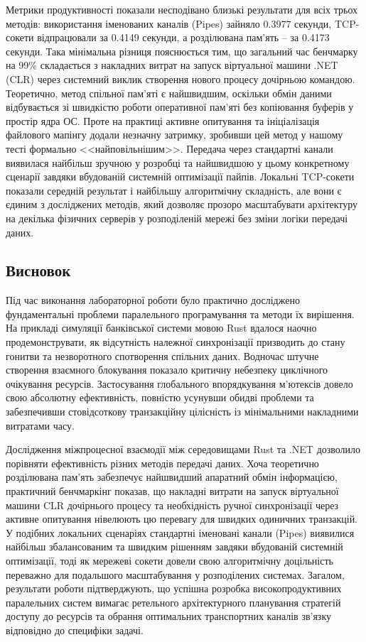 \documentclass[14pt, a4paper]{extreport}
\begin{document}
	Метрики продуктивності показали несподівано близькі результати для всіх трьох методів: використання іменованих каналів (Pipes) зайняло 0.3977 секунди, TCP-сокети відпрацювали за 0.4149 секунди, а розділювана пам'ять -- за 0.4173 секунди. Така мінімальна різниця пояснюється тим, що загальний час бенчмарку на 99\% складається з накладних витрат на запуск віртуальної машини .NET (CLR) через системний виклик створення нового процесу дочірньою командою. Теоретично, метод спільної пам'яті є найшвидшим, оскільки обмін даними відбувається зі швидкістю роботи оперативної пам'яті без копіювання буферів у простір ядра ОС. Проте на практиці активне опитування та ініціалізація файлового мапінгу додали незначну затримку, зробивши цей метод у нашому тесті формально <<найповільнішим>>. Передача через стандартні канали виявилася найбільш зручною у розробці та найшвидшою у цьому конкретному сценарії завдяки вбудованій системній оптимізації пайпів. Локальні TCP-сокети показали середній результат і найбільшу алгоритмічну складність, але вони є єдиним з досліджених методів, який дозволяє прозоро масштабувати архітектуру на декілька фізичних серверів у розподіленій мережі без зміни логіки передачі даних.
	
	
	\subsection*{Висновок}
	
	Під час виконання лабораторної роботи було практично досліджено фундаментальні проблеми паралельного програмування та методи їх вирішення. На прикладі симуляції банківської системи мовою Rust вдалося наочно продемонструвати, як відсутність належної синхронізації призводить до стану гонитви та незворотного спотворення спільних даних. Водночас штучне створення взаємного блокування показало критичну небезпеку циклічного очікування ресурсів. Застосування глобального впорядкування м'ютексів довело свою абсолютну ефективність, повністю усунувши обидві проблеми та забезпечивши стовідсоткову транзакційну цілісність із мінімальними накладними витратами часу.
	
	Дослідження міжпроцесної взаємодії між середовищами Rust та .NET дозволило порівняти ефективність різних методів передачі даних. Хоча теоретично розділювана пам'ять забезпечує найшвидший апаратний обмін інформацією, практичний бенчмаркінг показав, що накладні витрати на запуск віртуальної машини CLR дочірнього процесу та необхідність ручної синхронізації через активне опитування нівелюють цю перевагу для швидких одиничних транзакцій. У подібних локальних сценаріях стандартні іменовані канали (Pipes) виявилися найбільш збалансованим та швидким рішенням завдяки вбудованій системній оптимізації, тоді як мережеві сокети довели свою алгоритмічну доцільність переважно для подальшого масштабування у розподілених системах. Загалом, результати роботи підтверджують, що успішна розробка високопродуктивних паралельних систем вимагає ретельного архітектурного планування стратегій доступу до ресурсів та обрання оптимальних транспортних каналів зв'язку відповідно до специфіки задачі.
	
\end{document}
